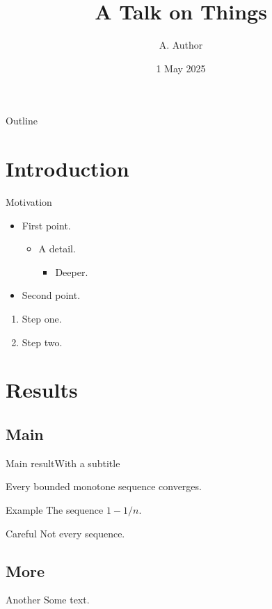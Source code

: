 \documentclass{beamer}
\title[Short]{A Talk on Things}
\author{A. Author}
\institute{Institute}
\date{1 May 2025}
\begin{document}
\begin{frame}
\titlepage
\end{frame}
\begin{frame}{Outline}
\tableofcontents
\end{frame}
\section{Introduction}
\begin{frame}{Motivation}
\begin{itemize}
\item First point.
\begin{itemize}
\item A detail.
\begin{itemize}
\item Deeper.
\end{itemize}
\end{itemize}
\item Second point.
\end{itemize}
\begin{enumerate}
\item Step one.
\item Step two.
\end{enumerate}
\end{frame}
\section{Results}
\subsection{Main}
\begin{frame}{Main result}{With a subtitle}
\begin{theorem}
Every bounded monotone sequence converges.
\end{theorem}
\begin{exampleblock}{Example}
The sequence $1 - 1/n$.
\end{exampleblock}
\begin{alertblock}{Careful}
Not every sequence.
\end{alertblock}
\end{frame}
\subsection{More}
\begin{frame}{Another}
Some text.
\end{frame}
\end{document}
